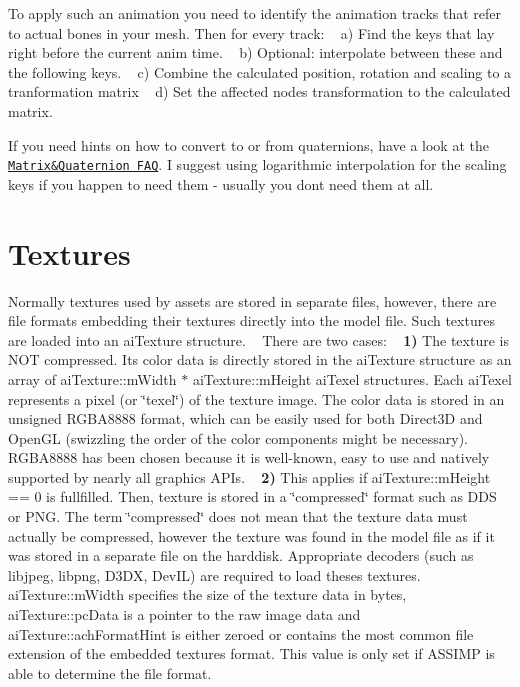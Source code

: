 To apply such an animation you need to identify the animation tracks that refer to actual bones in your mesh. Then for every track\+: ~\newline
 a) Find the keys that lay right before the current anim time. ~\newline
 b) Optional\+: interpolate between these and the following keys. ~\newline
 c) Combine the calculated position, rotation and scaling to a tranformation matrix ~\newline
 d) Set the affected node\textquotesingle{}s transformation to the calculated matrix. ~\newline


If you need hints on how to convert to or from quaternions, have a look at the \href{http://www.j3d.org/matrix_faq/matrfaq_latest.html}{\tt Matrix\&Quaternion F\+A\+Q}. I suggest using logarithmic interpolation for the scaling keys if you happen to need them -\/ usually you don\textquotesingle{}t need them at all.\hypertarget{data_textures}{}\section{Textures}\label{data_textures}
Normally textures used by assets are stored in separate files, however, there are file formats embedding their textures directly into the model file. Such textures are loaded into an ai\+Texture structure. ~\newline
 There are two cases\+: ~\newline
 {\bfseries 1)} The texture is N\+O\+T compressed. Its color data is directly stored in the ai\+Texture structure as an array of ai\+Texture\+::m\+Width $\ast$ ai\+Texture\+::m\+Height ai\+Texel structures. Each ai\+Texel represents a pixel (or \char`\"{}texel\char`\"{}) of the texture image. The color data is stored in an unsigned R\+G\+B\+A8888 format, which can be easily used for both Direct3\+D and Open\+G\+L (swizzling the order of the color components might be necessary). R\+G\+B\+A8888 has been chosen because it is well-\/known, easy to use and natively supported by nearly all graphics A\+P\+Is. ~\newline
 {\bfseries 2)} This applies if ai\+Texture\+::m\+Height == 0 is fullfilled. Then, texture is stored in a \char`\"{}compressed\char`\"{} format such as D\+D\+S or P\+N\+G. The term \char`\"{}compressed\char`\"{} does not mean that the texture data must actually be compressed, however the texture was found in the model file as if it was stored in a separate file on the harddisk. Appropriate decoders (such as libjpeg, libpng, D3\+D\+X, Dev\+I\+L) are required to load theses textures. ai\+Texture\+::m\+Width specifies the size of the texture data in bytes, ai\+Texture\+::pc\+Data is a pointer to the raw image data and ai\+Texture\+::ach\+Format\+Hint is either zeroed or contains the most common file extension of the embedded texture\textquotesingle{}s format. This value is only set if A\+S\+S\+I\+M\+P is able to determine the file format. 